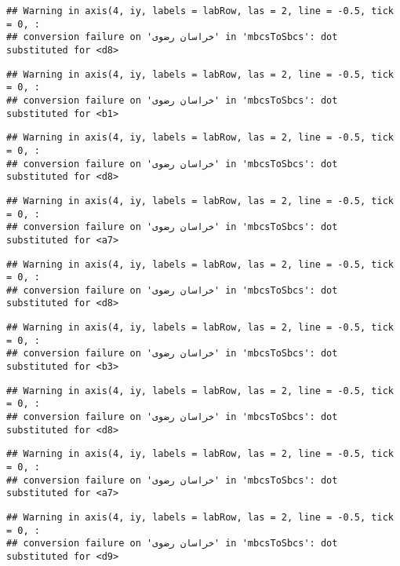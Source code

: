 \documentclass[
]{article}
\begin{document}
\begin{verbatim}
## Warning in axis(4, iy, labels = labRow, las = 2, line = -0.5, tick = 0, :
## conversion failure on 'خراسان رضوی' in 'mbcsToSbcs': dot substituted for <d8>
\end{verbatim}

\begin{verbatim}
## Warning in axis(4, iy, labels = labRow, las = 2, line = -0.5, tick = 0, :
## conversion failure on 'خراسان رضوی' in 'mbcsToSbcs': dot substituted for <b1>
\end{verbatim}

\begin{verbatim}
## Warning in axis(4, iy, labels = labRow, las = 2, line = -0.5, tick = 0, :
## conversion failure on 'خراسان رضوی' in 'mbcsToSbcs': dot substituted for <d8>
\end{verbatim}

\begin{verbatim}
## Warning in axis(4, iy, labels = labRow, las = 2, line = -0.5, tick = 0, :
## conversion failure on 'خراسان رضوی' in 'mbcsToSbcs': dot substituted for <a7>
\end{verbatim}

\begin{verbatim}
## Warning in axis(4, iy, labels = labRow, las = 2, line = -0.5, tick = 0, :
## conversion failure on 'خراسان رضوی' in 'mbcsToSbcs': dot substituted for <d8>
\end{verbatim}

\begin{verbatim}
## Warning in axis(4, iy, labels = labRow, las = 2, line = -0.5, tick = 0, :
## conversion failure on 'خراسان رضوی' in 'mbcsToSbcs': dot substituted for <b3>
\end{verbatim}

\begin{verbatim}
## Warning in axis(4, iy, labels = labRow, las = 2, line = -0.5, tick = 0, :
## conversion failure on 'خراسان رضوی' in 'mbcsToSbcs': dot substituted for <d8>
\end{verbatim}

\begin{verbatim}
## Warning in axis(4, iy, labels = labRow, las = 2, line = -0.5, tick = 0, :
## conversion failure on 'خراسان رضوی' in 'mbcsToSbcs': dot substituted for <a7>
\end{verbatim}

\begin{verbatim}
## Warning in axis(4, iy, labels = labRow, las = 2, line = -0.5, tick = 0, :
## conversion failure on 'خراسان رضوی' in 'mbcsToSbcs': dot substituted for <d9>
\end{verbatim}
\end{document}
